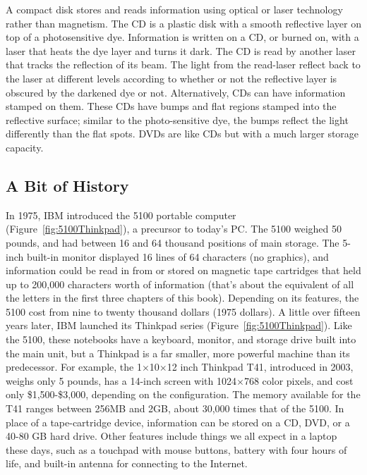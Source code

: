 A compact disk stores and reads information using optical or laser
technology rather than magnetism. The CD is a plastic disk with a
smooth reflective layer on top of a photosensitive dye.  Information
is written on a CD, or burned on, with a laser that heats the dye
layer and turns it dark. The CD is read by another laser that tracks
the reflection of its beam.  The light from the read-laser reflect
back to the laser at different levels according to whether or not the
reflective layer is obscured by the darkened dye or
not. Alternatively, CDs can have information stamped on them.  These
CDs have bumps and flat regions stamped into the reflective surface;
similar to the photo-sensitive dye, the bumps reflect the light
differently than the flat spots. DVDs are like CDs but with a much
larger storage capacity.


\subsection{A Bit of History}
In 1975, IBM introduced the 5100 portable computer
(Figure~\ref{fig:5100Thinkpad}), a precursor to today's PC. The 5100
weighed 50 pounds, and had between 16 and 64 thousand positions of
main storage. The 5-inch built-in monitor displayed 16 lines of 64
characters (no graphics), and information could be read in from or
stored on magnetic tape cartridges that held up to 200,000 characters
worth of information (that's about the equivalent of all the letters
in the first three chapters of this book).  Depending on its features,
the 5100 cost from nine to twenty thousand dollars (1975 dollars).  A
little over fifteen years later, IBM launched its Thinkpad series
(Figure~\ref{fig:5100Thinkpad}).  Like the 5100, these notebooks have
a keyboard, monitor, and storage drive built into the main unit, but a
Thinkpad is a far smaller, more powerful machine than its
predecessor. For example, the 1$\times$10$\times$12 inch Thinkpad T41,
introduced in 2003, weighs only 5 pounds, has a 14-inch screen with
1024$\times$768 color pixels, and cost only \$1,500-\$3,000, depending
on the configuration. The memory available for the T41 ranges between
256MB and 2GB, about 30,000 times that of the 5100. In place of a
tape-cartridge device, information can be stored on a CD, DVD, or a
40-80 GB hard drive. Other features include things we all expect in a
laptop these days, such as a touchpad with mouse buttons, battery with
four hours of life, and built-in antenna for connecting to the
Internet.

